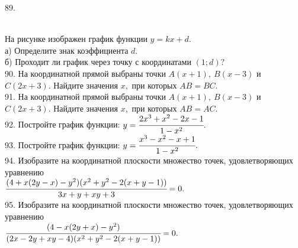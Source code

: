 89. \begin{figure}[ht!]
\end{figure}\\
На рисунке изображен график функции $y=kx+d.$\\
а) Определите знак коэффициента $d.$\\
б) Проходит ли график через точку с координатами $(1; d) ?$\\
90. На координатной прямой выбраны точки $A(x + 1),\ B(x - 3)$ и $C(2x + 3).$ Найдите значения $x,$ при которых $AB = BC.$\\
91. На координатной прямой выбраны точки $A(x + 1),\ B(x - 3)$ и $C(2x + 3).$ Найдите значения $x,$ при которых $AB = AC.$\\
92. Постройте график функции: $y=\cfrac{2x^3+x^2-2x-1}{1-x^2}.$\\
93. Постройте график функции: $y=\cfrac{x^3-x^2-x+1}{1-x^2}.$\\
94. Изобразите на координатной плоскости множество точек, удовлетворяющих уравнению \\$\cfrac{(4+x(2y-x)-y^2)(x^2+y^2-2(x+y-1))}{3x+y+xy+3}=0.$\\
95. Изобразите на координатной плоскости множество точек, удовлетворяющих уравнению \\ $\cfrac{(4-x(2y+x)-y^2)}{(2x-2y+xy-4)(x^2+y^2-2(x+y-1))}=0.$
\newpage

